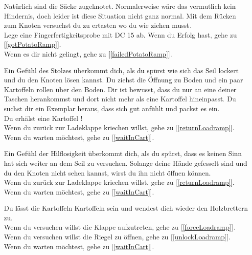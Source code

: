 
Natürlich sind die Säcke zugeknotet. Normalerweise wäre das vermutlich kein Hindernis, doch leider ist diese Situation nicht ganz normal. Mit dem Rücken zum Knoten versuchst du zu ertasten wo du wie ziehen musst.
\\Lege eine Fingerfertigkeitsprobe mit DC 15 ab. Wenn du Erfolg hast, gehe zu [\ref{gotPotatoRamp}].
\\Wenn es dir nicht gelingt, gehe zu [\ref{failedPotatoRamp}].


Ein Gefühl des Stolzes überkommt dich, als du spürst wie sich das Seil lockert und du den Knoten lösen kannst. Du ziehst die Öffnung zu Boden und ein paar Kartoffeln rollen über den Boden. Dir ist bewusst, dass du nur an eine deiner Taschen herankommst und dort nicht mehr als eine Kartoffel hineinpasst. Du suchst dir ein Exemplar heraus, dass sich gut anfühlt und packst es ein.
\\Du erhälst eine Kartoffel !
\\Wenn du zurück zur Ladeklappe kriechen willst, gehe zu [\ref{returnLoadramp}].
\\Wenn du warten möchtest, gehe zu [\ref{waitInCart}].


Ein Gefühl der Hilflosigkeit überkommt dich, als du spürst, dass es keinen Sinn hat sich weiter an dem Seil zu versuchen. Solange deine Hände gefesselt sind und du den Knoten nicht sehen kannst, wirst du ihn nicht öffnen können.
\\Wenn du zurück zur Ladeklappe kriechen willst, gehe zu [\ref{returnLoadramp}].
\\Wenn du warten möchtest, gehe zu [\ref{waitInCart}].


Du lässt die Kartoffeln Kartoffeln sein und wendest dich wieder den Holzbrettern zu.
\\Wenn du versuchen willst die Klappe aufzutreten, gehe zu [\ref{forceLoadramp}].
\\Wenn du versuchen willst die Riegel zu öffnen, gehe zu [\ref{unlockLoadramp}].
\\Wenn du warten möchtest, gehe zu [\ref{waitInCart}].


